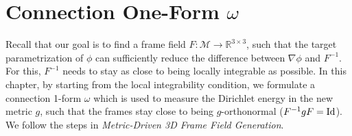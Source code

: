 \documentclass[../thesis.tex]{subfiles}
\begin{document}
\chapter{Connection One-Form $\omega$}
\label{ch:connection}

Recall that our goal is to find a frame field $F:\mathcal{M}\to \mathbb{R}^{3\times3}$,
such that the target parametrization of $\phi$ can sufficiently reduce
the difference between $\nabla \phi$ and $F^{-1}$.
For this, $F^{-1}$ needs to stay as close to being locally integrable
as possible. 
In this chapter, by starting from the local integrability condition,
we formulate a connection 1-form $\omega$ which is used to
measure the Dirichlet energy in the new metric $g$, such that
the frames stay close to being $g$-orthonormal ($F^{-1}gF= \operatorname{Id}$).
We follow the steps in \emph{Metric-Driven 3D Frame Field Generation}\cite{Fang23}.
\end{document}
